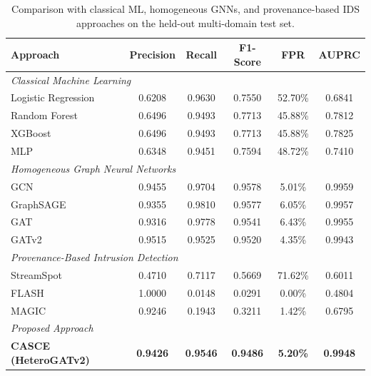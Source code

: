 \documentclass[conference]{IEEEtran}
\begin{document}
\begin{table}[t]
\centering
\caption{Comparison with classical ML, homogeneous GNNs, and provenance-based IDS approaches on the held-out multi-domain test set.}
\label{tab:baseline_comparison}
\small
\begin{tabular}{lccccc}
\toprule
\textbf{Approach} &
\textbf{Precision} &
\textbf{Recall} &
\textbf{F1-Score} &
\textbf{FPR} &
\textbf{AUPRC} \\
\midrule

\multicolumn{6}{l}{\textit{Classical Machine Learning}} \\
Logistic Regression & 0.6208 & 0.9630 & 0.7550 & 52.70\% & 0.6841 \\
Random Forest       & 0.6496 & 0.9493 & 0.7713 & 45.88\% & 0.7812 \\
XGBoost              & 0.6496 & 0.9493 & 0.7713 & 45.88\% & 0.7825 \\
MLP                  & 0.6348 & 0.9451 & 0.7594 & 48.72\% & 0.7410 \\

\midrule
\multicolumn{6}{l}{\textit{Homogeneous Graph Neural Networks}} \\
GCN                  & 0.9455 & 0.9704 & 0.9578 & 5.01\%  & 0.9959 \\
GraphSAGE            & 0.9355 & 0.9810 & 0.9577 & 6.05\%  & 0.9957 \\
GAT                  & 0.9316 & 0.9778 & 0.9541 & 6.43\%  & 0.9955 \\
GATv2                & 0.9515 & 0.9525 & 0.9520 & 4.35\%  & 0.9943 \\

\midrule
\multicolumn{6}{l}{\textit{Provenance-Based Intrusion Detection}} \\
StreamSpot           & 0.4710 & 0.7117 & 0.5669 & 71.62\% & 0.6011 \\
FLASH                & 1.0000 & 0.0148 & 0.0291 & 0.00\%  & 0.4804 \\
MAGIC                & 0.9246 & 0.1943 & 0.3211 & 1.42\%  & 0.6795 \\

\midrule
\multicolumn{6}{l}{\textit{Proposed Approach}} \\
\textbf{CASCE (HeteroGATv2)} & \textbf{0.9426} & \textbf{0.9546} & \textbf{0.9486} & \textbf{5.20\%} & \textbf{0.9948} \\

\bottomrule
\end{tabular}
\end{table}
\end{document}
